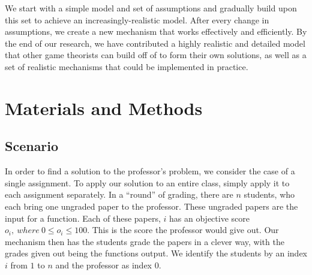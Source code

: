 \documentclass[12pt, Arial]{article}
\begin{document}
We start with a simple model and set of assumptions and gradually build upon this set to achieve an increasingly-realistic model. After every change in assumptions, we create a new mechanism that works effectively and efficiently. By the end of our research, we have contributed a highly realistic and detailed model that other game theorists can build off of to form their own solutions, as well as a set of realistic mechanisms that could be implemented in practice.
\section{Materials and Methods}
\subsection{Scenario}
In order to find a solution to the professor's problem, we consider the case of a single assignment. To apply our solution to an entire class, simply apply it to each assignment separately. In a ``round'' of grading, there are $n$ students, who each bring one ungraded paper to the professor. These ungraded papers are the input for a function. Each of these papers, $i$ has an objective score $o_i,~where~ 0\leq o_i \leq 100$. This is the score the professor would give out. Our mechanism then has the students grade the papers in a clever way, with the grades given out being the functions output. We identify the students by an index $i$ from $1$ to $n$ and the professor as index $0$.
\end{document}

